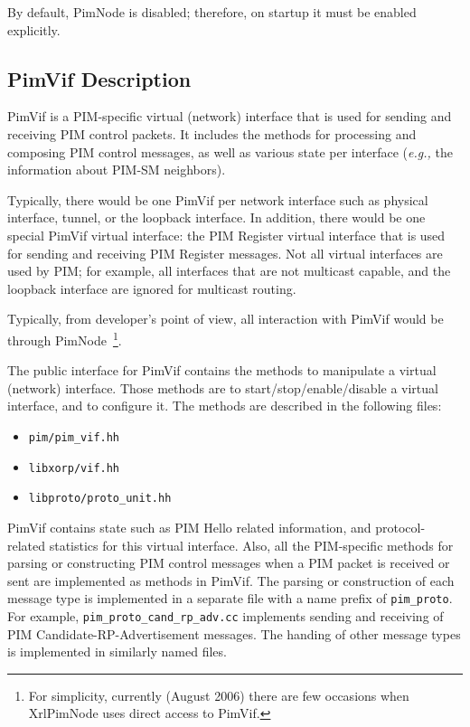 \documentclass[11pt]{article}
\newcommand{\eg}{\emph{e.g.,}\xspace}
\begin{document}
By default, PimNode is disabled; therefore, on startup it must be enabled
explicitly.

\subsection{PimVif Description}

PimVif is a PIM-specific virtual (network) interface that is used for sending
and receiving PIM control packets. It includes the methods for processing and
composing PIM control messages, as well as various state per interface
(\eg the information about PIM-SM neighbors).

Typically, there would be one PimVif per network interface such as
physical interface, tunnel, or the loopback
interface. In addition, there would be one special PimVif virtual
interface: the PIM Register virtual interface that is used for sending
and receiving PIM Register messages. Not all virtual interfaces are
used by PIM; for example, all interfaces that are not multicast
capable, and the loopback interface are ignored for multicast
routing.

Typically, from developer's point of view, all interaction with PimVif
would be through PimNode~\footnote{For simplicity, currently (August 2006)
there are few occasions when XrlPimNode uses direct access to PimVif.}.

The public interface for PimVif contains the methods to manipulate a
virtual (network) interface. Those methods are to start/stop/enable/disable a
virtual interface, and to configure it. The methods are described in
the following files:

\begin{itemize}
  \item \verb=pim/pim_vif.hh=
  \item \verb=libxorp/vif.hh=
  \item \verb=libproto/proto_unit.hh=
\end{itemize}

PimVif contains state such as PIM Hello related information, and
protocol-related statistics for this virtual interface. Also, all
the PIM-specific methods for parsing or constructing PIM control
messages when a PIM packet is received or sent are implemented as
methods in PimVif. The parsing or construction of each message type is
implemented in a separate file with a name prefix of \verb=pim_proto=.
For example, \verb=pim_proto_cand_rp_adv.cc= implements sending and
receiving of PIM Candidate-RP-Advertisement messages. The handing of
other message types is implemented in similarly named files.
\end{document}
